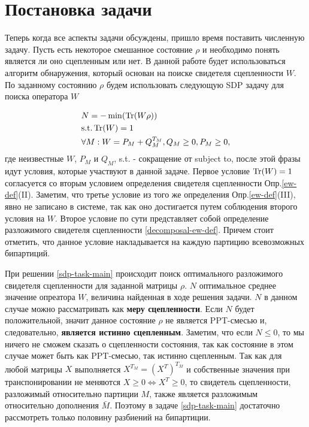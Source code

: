 \section{Постановка задачи}
Теперь когда все аспекты задачи обсуждены, пришло время поставить численную задачу. Пусть есть некоторое смешанное состояние $\rho$ и необходимо понять является ли оно сцепленным или нет. В данной работе будет использоваться алгоритм обнаружения, который основан на поиске свидетеля сцепленности $W$. По заданному состоянию $\rho$ будем использовать следующую SDP задачу для поиска оператора $W$

\begin{equation}\label{sdp-task-main}
\begin{split}
    & N = - \min (\Tr(W \rho)) \\
    & \text{s.t.} \Tr(W) = 1 \\
    & \forall M: W = P_M + Q_M^{T_M}, Q_M \geq 0, P_M \geq 0,
\end{split}
\end{equation}
где неизвестные  $W$, $P_M$ и $Q_M$, s.t. - сокращение от subject to, после этой фразы идут условия, которые участвуют в данной задаче. Первое условие $\Tr(W) = 1$  согласуется со вторым условием определения свидетеля сцепленности Опр.\ref{ew-def}(II). Заметим, что третье условие из того же определения Опр.\ref{ew-def}(III), явно не записано в системе, так как оно достигается путем соблюдения второго условия на $W$.
Второе условие по сути представляет собой определение разложимого свидетеля сцепленности \ref{decomposal-ew-def}. Причем стоит отметить, что данное условие накладывается на каждую партицию всевозможных бипартиций.

При решении \ref{sdp-task-main} происходит поиск оптимального разложимого свидетеля сцепленности для заданной матрицы $\rho$.
$N$ оптимальное среднее значение опреатора $W$, величина найденная в ходе решения задачи. $N$ в данном случае можно рассматривать как \textbf{меру сцепленности}.  Если $N$ будет положительной, значит данное состояние $\rho$ не является PPT-смесью и, следовательно, \textbf{является истинно сцепленным}. Заметим, что если $N \leq 0$, то мы ничего не сможем сказать о сцепленности состояния, так как состояние в этом случае может быть как PPT-смесью, так истинно сцепленным. Так как  для любой матрицы $X$ выполняется $X^{T_M} = (X^{T})^{T_{\bar M}}$ и собственные значения при транспонировании не меняются $X \geq 0 \Leftrightarrow X^{T} \geq 0$, то свидетель сцепленности, разложимый относительно партиции $M$, также является разложимым относительно дополнения $\bar M$. Поэтому в задаче \ref{sdp-task-main} достаточно рассмотреть только половину разбиений на бипартиции.


